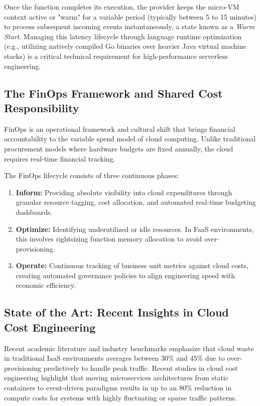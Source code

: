 \documentclass[conference]{IEEEtran}
\begin{document}
Once the function completes its execution, the provider keeps the micro-VM context active or "warm" for a variable period (typically between 5 to 15 minutes) to process subsequent incoming events instantaneously, a state known as a \textit{Warm Start}. Managing this latency lifecycle through language runtime optimization (e.g., utilizing natively compiled Go binaries over heavier Java virtual machine stacks) is a critical technical requirement for high-performance serverless engineering.

\subsection{The FinOps Framework and Shared Cost Responsibility}
FinOps is an operational framework and cultural shift that brings financial accountability to the variable spend model of cloud computing. Unlike traditional procurement models where hardware budgets are fixed annually, the cloud requires real-time financial tracking. 

The FinOps lifecycle consists of three continuous phases:
\begin{enumerate}
    \item \textbf{Inform:} Providing absolute visibility into cloud expenditures through granular resource tagging, cost allocation, and automated real-time budgeting dashboards.
    \item \textbf{Optimize:} Identifying underutilized or idle resources. In FaaS environments, this involves rightsizing function memory allocation to avoid over-provisioning.
    \item \textbf{Operate:} Continuous tracking of business unit metrics against cloud costs, creating automated governance policies to align engineering speed with economic efficiency.
\end{enumerate}

\subsection{State of the Art: Recent Insights in Cloud Cost Engineering}
Recent academic literature and industry benchmarks emphasize that cloud waste in traditional IaaS environments averages between 30\% and 45\% due to over-provisioning predictively to handle peak traffic. Recent studies in cloud cost engineering highlight that moving microservices architectures from static containers to event-driven paradigms results in up to an 80\% reduction in compute costs for systems with highly fluctuating or sparse traffic patterns. 
\end{document}
